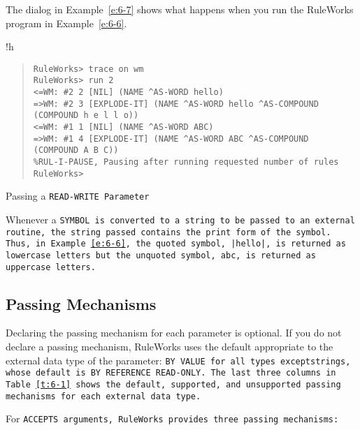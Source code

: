 The dialog in Example~\ref{e:6-7} shows what happens when you run the
RuleWorks program in Example~\ref{e:6-6}.

\begin{example}{!h}
\begin{quote}
\begin{verbatim}
RuleWorks> trace on wm
RuleWorks> run 2
<=WM: #2 2 [NIL] (NAME ^AS-WORD hello)
=>WM: #2 3 [EXPLODE-IT] (NAME ^AS-WORD hello ^AS-COMPOUND (COMPOUND h e l l o))
<=WM: #1 1 [NIL] (NAME ^AS-WORD ABC)
=>WM: #1 4 [EXPLODE-IT] (NAME ^AS-WORD ABC ^AS-COMPOUND (COMPOUND A B C))
%RUL-I-PAUSE, Pausing after running requested number of rules
RuleWorks>
\end{verbatim}
\end{quote}
\caption{Passing a \tt{READ-WRITE} Parameter}
\label{e:6-7}
\end{example}

\begin{note}
  Whenever a \tt{SYMBOL} is converted to a string to be passed to an
  external routine, the string passed contains the print form of the
  symbol. Thus, in Example~\ref{e:6-6}, the quoted symbol, \verb,|hello|,, is
  returned as lowercase letters but the unquoted symbol, \tt{abc}, is
  returned as uppercase letters.
\end{note}

\subsection{Passing Mechanisms}

Declaring the passing mechanism for each parameter is optional. If you
do not declare a passing mechanism, RuleWorks uses the default
appropriate to the external data type of the parameter: \tt{BY VALUE}
for all types exceptstrings, whose default is \tt{BY REFERENCE
  READ-ONLY}. The last three columns in Table~\ref{t:6-1} shows the
default, supported, and unsupported passing mechanisms for each
external data type.

For \tt{ACCEPTS} arguments, RuleWorks provides three passing
mechanisms:

